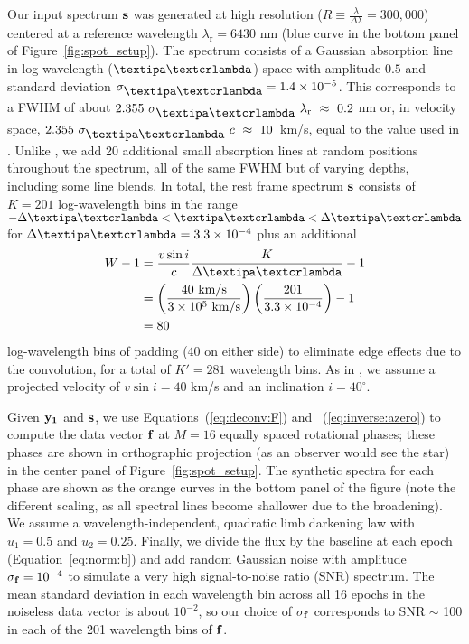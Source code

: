 \documentclass[modern]{aastex631}
\begin{document}
Our input spectrum ${\mathbf{s}}$ was generated at high resolution ($R \equiv \frac{\lambda}{\Delta\lambda} = 300,000$) centered at a reference wavelength $\lambda_\mathrm{r} = 6430$ nm (blue curve in the bottom panel of Figure~\ref{fig:spot_setup}).
The spectrum consists of a Gaussian absorption line in log-wavelength ($\lnlam$) space with amplitude $0.5$ and standard deviation $\sigma_{\lnlam} = 1.4\times 10^{-5}$. 
This corresponds to a FWHM of about $2.355~\sigma_{\lnlam}~\lambda_\mathrm{r}~\approx~0.2$ nm or, in velocity space, $2.355~\sigma_{\lnlam}~c~\approx~10$~km/s, equal to the value used in \citet{Vogt1987}. 
Unlike \citet{Vogt1987}, we add 20 additional small absorption lines at random positions throughout the spectrum, all of the same FWHM but of varying depths, including some line blends. 
In total, the rest frame spectrum ${\mathbf{s}}$ consists of $K = 201$ log-wavelength bins in the range $-\Delta\lnlam < \lnlam < \Delta\lnlam$ for $\Delta\lnlam = 3.3\times 10^{-4}$ plus an additional
%
\begin{align}
    W - 1 & = \frac{v\sin i}{c} \frac{K}{\Delta\lnlam} - 1 \nonumber           \\
          & = \left(\frac{40~\mathrm{km/s}}{3\times 10^5~\mathrm{km/s}}\right)
    \left(\frac{201}{3.3 \times 10^{-4}}\right)  - 1 \nonumber                 \\
          & = 80
\end{align}
%
log-wavelength bins of padding (40 on either side) to eliminate edge effects due to the convolution, for a total of $K' = 281$ wavelength bins. 
As in \citet{Vogt1987}, we assume a projected velocity of $v\sin i = 40$ km/s and an inclination $i = 40^\circ$.

Given ${\mathbf{y_1}}$ and ${\mathbf{s}}$, we use Equations~(\ref{eq:deconv:F}) and~%
(\ref{eq:inverse:azero}) to compute the data vector ${\mathbf{f}}$ at $M = 16$ equally spaced rotational phases; these phases are shown in orthographic projection (as an observer would see the star) in the center panel of Figure~\ref{fig:spot_setup}. 
The synthetic spectra for each phase are shown as the orange curves in the bottom panel of the figure (note the different scaling, as all spectral lines become shallower due to the broadening). 
We assume a wavelength-independent, quadratic limb darkening law with $u_1 = 0.5$ and $u_2 = 0.25$. 
Finally, we divide the flux by the baseline at each epoch (Equation~\ref{eq:norm:b})
and add random Gaussian noise with amplitude $\sigma_{\mathbf{f}} = 10^{-4}$ to simulate a very high signal-to-noise ratio (SNR) spectrum. 
The mean standard deviation in each wavelength bin across all 16 epochs in the noiseless data vector is about $10^{-2}$, so our choice of $\sigma_{\mathbf{f}}$ corresponds to SNR $\sim$ 100 in each of the 201 wavelength bins of ${\mathbf{f}}$.
\end{document}
